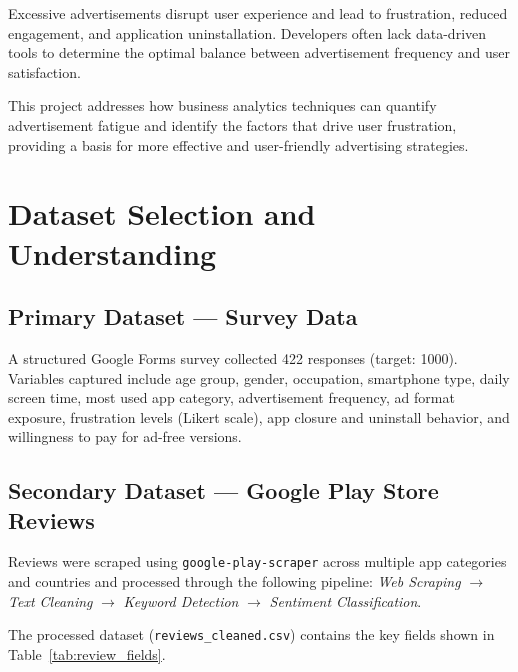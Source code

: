 \documentclass[12pt]{article}
\begin{document}
Excessive advertisements disrupt user experience and lead to frustration, reduced engagement, and application uninstallation. Developers often lack data-driven tools to determine the optimal balance between advertisement frequency and user satisfaction.

This project addresses how business analytics techniques can quantify advertisement fatigue and identify the factors that drive user frustration, providing a basis for more effective and user-friendly advertising strategies.

\section{Dataset Selection and Understanding}

\subsection{Primary Dataset — Survey Data}

A structured Google Forms survey collected 422 responses (target: 1000). Variables captured include age group, gender, occupation, smartphone type, daily screen time, most used app category, advertisement frequency, ad format exposure, frustration levels (Likert scale), app closure and uninstall behavior, and willingness to pay for ad-free versions.

\subsection{Secondary Dataset — Google Play Store Reviews}

Reviews were scraped using \texttt{google-play-scraper} across multiple app categories and countries and processed through the following pipeline: \textit{Web Scraping} $\rightarrow$ \textit{Text Cleaning} $\rightarrow$ \textit{Keyword Detection} $\rightarrow$ \textit{Sentiment Classification}.

The processed dataset (\texttt{reviews\_cleaned.csv}) contains the key fields shown in Table~\ref{tab:review_fields}.
\end{document}
